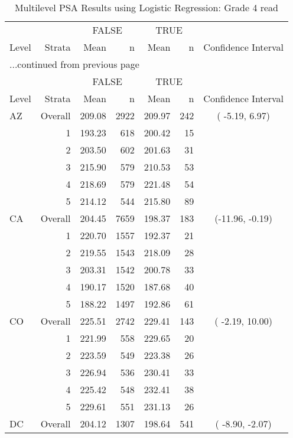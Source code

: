 \begin{longtable}{lrrr@{\extracolsep{.25cm}}rrc}
\caption{Multilevel PSA Results using Logistic Regression: Grade 4 read} \\ 
   \hline & & \multicolumn{2}{c}{FALSE} & \multicolumn{2}{c}{TRUE} & \\ \cline{3-4} \cline{5-6} Level & Strata & Mean & n & Mean & n & Confidence Interval \\ \hline\endfirsthead \multicolumn{7}{l}{{...continued from previous page}}\\ \hline  & & \multicolumn{2}{c}{FALSE} & \multicolumn{2}{c}{TRUE} & \\ \cline{3-4} \cline{5-6} Level & Strata & Mean & n & Mean & n & Confidence Interval \\ \hline \endhead \endfoot \endlastfoot  \hline
AZ & Overall & 209.08 & 2922 & 209.97 & 242 & ( -5.19,   6.97) \\ 
   & 1 & 193.23 & 618 & 200.42 &  15 &  \\ 
   & 2 & 203.50 & 602 & 201.63 &  31 &  \\ 
   & 3 & 215.90 & 579 & 210.53 &  53 &  \\ 
   & 4 & 218.69 & 579 & 221.48 &  54 &  \\ 
   & 5 & 214.12 & 544 & 215.80 &  89 &  \\ 
   \hline
CA & Overall & 204.45 & 7659 & 198.37 & 183 & (-11.96,  -0.19) \\ 
   & 1 & 220.70 & 1557 & 192.37 &  21 &  \\ 
   & 2 & 219.55 & 1543 & 218.09 &  28 &  \\ 
   & 3 & 203.31 & 1542 & 200.78 &  33 &  \\ 
   & 4 & 190.17 & 1520 & 187.68 &  40 &  \\ 
   & 5 & 188.22 & 1497 & 192.86 &  61 &  \\ 
   \hline
CO & Overall & 225.51 & 2742 & 229.41 & 143 & ( -2.19,  10.00) \\ 
   & 1 & 221.99 & 558 & 229.65 &  20 &  \\ 
   & 2 & 223.59 & 549 & 223.38 &  26 &  \\ 
   & 3 & 226.94 & 536 & 230.41 &  33 &  \\ 
   & 4 & 225.42 & 548 & 232.41 &  38 &  \\ 
   & 5 & 229.61 & 551 & 231.13 &  26 &  \\ 
   \hline
DC & Overall & 204.12 & 1307 & 198.64 & 541 & ( -8.90,  -2.07) \\ 

\end{longtable}
